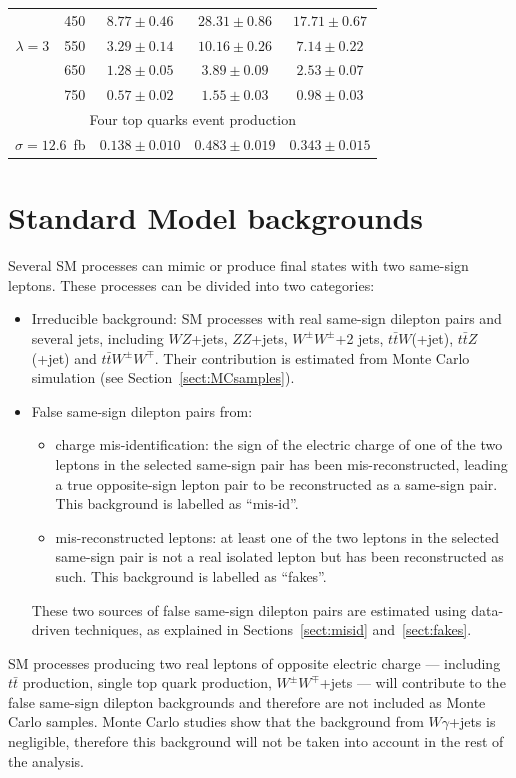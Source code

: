 \begin{table}[p]
\begin{center}
\begin{tabular}{c|c|c|c|c}
      \hline
      & 450 & $8.77 \pm 0.46$ & $28.31 \pm 0.86$ & $17.71 \pm 0.67$ \\
      $\lambda=3$ & 550 & $3.29 \pm 0.14$ & $10.16  \pm 0.26$ & $7.14  \pm 0.22$ \\
      & 650 & $1.28 \pm 0.05$ & $3.89  \pm 0.09$ & $2.53  \pm 0.07$ \\
      & 750 & $0.57 \pm 0.02$ & $1.55  \pm 0.03$ & $0.98  \pm 0.03$ \\
      \hline
      \multicolumn{5}{c}{Four top quarks event production} \\
      \hline
      \multicolumn{2}{c|}{$\sigma=12.6$~fb} & $0.138 \pm 0.010$ & $0.483\pm 0.019$& $0.343\pm 0.015$\\
      \hline
    \end{tabular}
  \end{center}
\end{table}

\section{Standard Model backgrounds}\label{sect:back}
Several SM processes can mimic or produce final states with two same-sign leptons. 
These processes can be divided into two categories:
\begin{itemize}
\item Irreducible background: SM processes with real same-sign dilepton pairs and
several jets, 
including $WZ$+jets, $ZZ$+jets, $W^{\pm}W^{\pm}$+2 jets, $t\bar{t}W$(+jet), $t\bar{t}Z$(+jet) and
$t\bar{t}W^{\pm}W^{\mp}$. Their contribution is estimated from Monte Carlo simulation
(see Section~\ref{sect:MCsamples}).
\item False same-sign dilepton pairs from:
  \begin{itemize}
  \item charge mis-identification: the sign of the electric charge of one of the two leptons in the 
    selected same-sign pair has been mis-reconstructed, leading a true opposite-sign lepton pair
    to be reconstructed as a same-sign pair.
    This background is labelled as ``mis-id''.
  \item mis-reconstructed leptons: at least one of the two leptons in the selected same-sign pair is not
    a real isolated lepton but has been reconstructed as such. This background is labelled as ``fakes''.
  \end{itemize}
  These two sources of false same-sign dilepton pairs are estimated using data-driven
  techniques, as explained in Sections~\ref{sect:misid} and~\ref{sect:fakes}.
\end{itemize}
SM processes producing two real leptons of opposite electric charge --- including 
$t\bar{t}$ production, single top quark production, $W^{\pm}W^{\mp}$+jets --- will contribute
to the false same-sign dilepton backgrounds and therefore are not included as Monte Carlo samples.
Monte Carlo studies show that the background from $W\gamma$+jets is negligible, therefore
this background will not be taken into account in the rest of the analysis.

